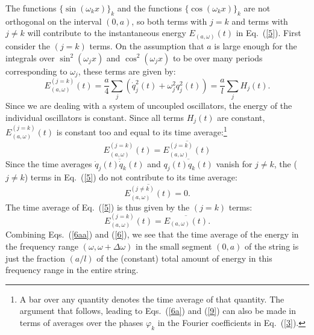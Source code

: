 \documentclass[12pt]{elsart}
\begin{document}
The functions $\{ \sin{(\omega_k x)} \}_k$ and the functions $\{ \cos{(\omega_k x)} \}_k$ are not orthogonal on the interval $(0,a)$, so both terms with $j=k$ and terms with $j \neq k$ will contribute to the instantaneous energy $E_{(a, \omega)}(t)$ in Eq.\ (\ref{5}). First consider the  $(j=k)$ terms. On the assumption that $a$ is large enough for the integrals over $\sin^2{(\omega_j x)}$ and $ \cos^2{(\omega_j x)}$ to be over many periods corresponding to $\omega_j$, these terms are given by:
\begin{equation}
E_{(a, \omega)}^{(j=k)}(t) = 
\frac{a}{4} \sum_{j}  \left( \dot{q}_j^2(t) + \omega_j^2  q_j^2(t) \right) =  \frac{a}{l} \sum_{j} H_j(t).
\label{6aa}
\end{equation}
Since we are dealing with a system of uncoupled oscillators, the energy of the individual oscillators is constant. Since all terms $H_j(t)$ are constant, $E_{(a, \omega)}^{(j=k)}(t)$ is constant too and equal to its time average:\footnote{A bar over any quantity denotes the time average of that quantity. The argument that follows, leading to Eqs.\ (\ref{6a}) and (\ref{9}) can also be made in terms of averages over the phases $\varphi_k$ in the Fourier coefficients in Eq.\ (\ref{3}). }
\begin{equation}
E_{(a, \omega)}^{(j=k)}(t) = \overline{ E_{(a, \omega)}^{(j=k)}(t) }
\label{6a}
\end{equation}
Since the time averages $\overline{\dot{q}_j(t) \dot{q}_k(t) }$ and $\overline{q_j(t) q_k(t)}$ vanish for $j \neq k$, the ($j \neq k$) terms in Eq.\ (\ref{5}) do not contribute to its time average:
\begin{equation}
\overline{ E_{(a, \omega)}^{(j \neq k)}(t) } = 0.
\label{6ac}
\end{equation}
The time average of Eq.\ (\ref{5}) is thus given by the $(j=k)$ terms:
\begin{equation}
E_{(a, \omega)}^{(j=k)}(t) = \overline{E_{(a, \omega)}(t)}.
\label{6}
\end{equation}
Combining Eqs.\ (\ref{6aa}) and (\ref{6}), we see that the time average of the energy in the frequency range $(\omega, \omega + \Delta \omega)$ in the small segment $(0,a)$ of the string is just the fraction $(a/l)$ of the (constant) total amount of energy in this frequency range  in the entire string.
\end{document}
